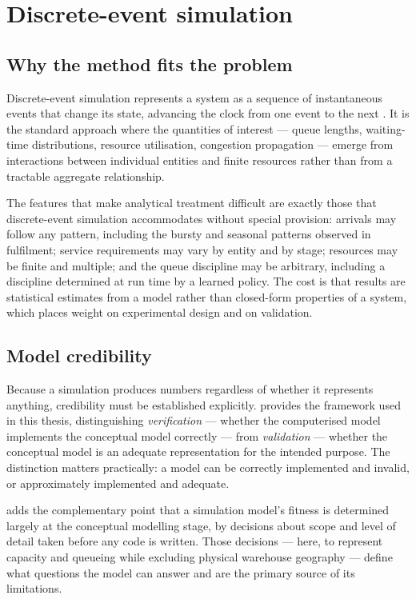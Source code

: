 \section{Discrete-event simulation}
\label{sec:lit-des}

\subsection{Why the method fits the problem}

Discrete-event simulation represents a system as a sequence of instantaneous events that change
its state, advancing the clock from one event to the next \citep{law2015}. It is the standard
approach where the quantities of interest --- queue lengths, waiting-time distributions,
resource utilisation, congestion propagation --- emerge from interactions between individual
entities and finite resources rather than from a tractable aggregate relationship.

The features that make analytical treatment difficult are exactly those that discrete-event
simulation accommodates without special provision: arrivals may follow any pattern, including
the bursty and seasonal patterns observed in fulfilment; service requirements may vary by entity
and by stage; resources may be finite and multiple; and the queue discipline may be arbitrary,
including a discipline determined at run time by a learned policy. The cost is that results are
statistical estimates from a model rather than closed-form properties of a system, which places
weight on experimental design and on validation.

\subsection{Model credibility}

Because a simulation produces numbers regardless of whether it represents anything, credibility
must be established explicitly. \citet{sargent2008} provides the framework used in this thesis,
distinguishing \emph{verification} --- whether the computerised model implements the conceptual
model correctly --- from \emph{validation} --- whether the conceptual model is an adequate
representation for the intended purpose. The distinction matters practically: a model can be
correctly implemented and invalid, or approximately implemented and adequate.

\citet{robinson2008} adds the complementary point that a simulation model's fitness is
determined largely at the conceptual modelling stage, by decisions about scope and level of
detail taken before any code is written. Those decisions --- here, to represent capacity and
queueing while excluding physical warehouse geography --- define what questions the model can
answer and are the primary source of its limitations.

